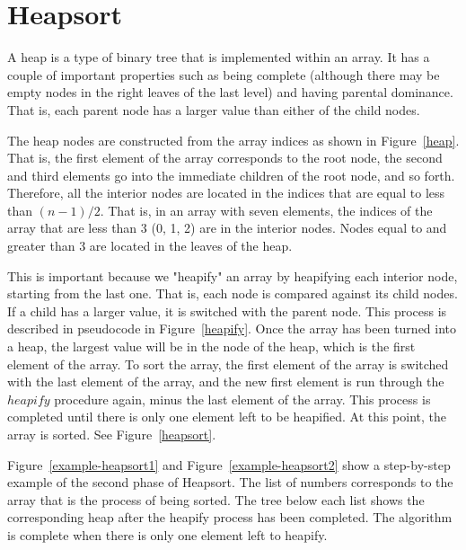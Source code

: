 \documentclass{article}
\begin{document}
\section{Heapsort}
A heap is a type of binary tree that is implemented within an array. It has a couple of important
properties such as being complete (although there may be empty nodes in the right leaves of the
last level) and having parental dominance. That is, each parent node has a larger value than either of the child nodes. 

The heap nodes are constructed from the array indices as shown in Figure~\ref{heap}. That is,
the first element of the array corresponds to the root node, the second and third elements go
into the immediate children of the root node, and so forth. Therefore, all the interior nodes
are located in the indices that are equal to less than $(n-1)/2$. That is, in an array with seven
elements, the indices of the array that are less than 3 (0, 1, 2) are in the interior nodes. Nodes
equal to and greater than 3 are located in the leaves of the heap.

This is important because we "heapify" an array by heapifying each interior node, starting from the
last one. That is, each node is compared against its child nodes. If a child has a larger value,
it is switched with the parent node. This process is described in pseudocode in Figure~\ref{heapify}.
Once the array has been turned into a heap, the largest value will be in the node of the heap, which
is the first element of the array. To sort the array, the first element of the array is switched with the
last element of the array, and the new first element is run through the $heapify$ procedure
again, minus the last element of the array. This process is completed until there is only one
element left to be heapified. At this point, the array is sorted. See Figure~\ref{heapsort}.

Figure~\ref{example-heapsort1} and Figure~\ref{example-heapsort2} show a step-by-step
example of the second phase of Heapsort. The list of numbers corresponds to the array
that is the process of being sorted. The tree below each list shows the corresponding
heap after the heapify process has been completed. The algorithm is complete when there is
only one element left to heapify.
\end{document}
